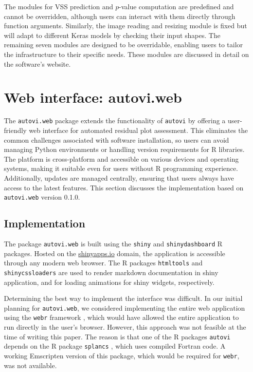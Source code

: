 \documentclass[
doublespace,
  times]{anzsauth}
\begin{document}
The modules for VSS prediction and \(p\)-value computation are
predefined and cannot be overridden, although users can interact with
them directly through function arguments. Similarly, the image reading
and resizing module is fixed but will adapt to different Keras models by
checking their input shapes. The remaining seven modules are designed to
be overridable, enabling users to tailor the infrastructure to their
specific needs. These modules are discussed in detail on the software's
website.

\section{Web interface: autovi.web}\label{sec-autovi-web}

The \texttt{autovi.web} package extends the functionality of
\texttt{autovi} by offering a user-friendly web interface for automated
residual plot assessment. This eliminates the common challenges
associated with software installation, so users can avoid managing
Python environments or handling version requirements for R libraries.
The platform is cross-platform and accessible on various devices and
operating systems, making it suitable even for users without R
programming experience. Additionally, updates are managed centrally,
ensuring that users always have access to the latest features. This
section discusses the implementation based on \texttt{autovi.web}
version 0.1.0.

\subsection{Implementation}\label{implementation}

The package \texttt{autovi.web} is built using the \texttt{shiny}
\citep{shiny} and \texttt{shinydashboard} \citep{shinydashboard} R
packages. Hosted on the \href{https://www.shinyapps.io}{shinyapps.io}
domain, the application is accessible through any modern web browser.
The R packages \texttt{htmltools} \citep{htmltools} and
\texttt{shinycssloaders} \citep{shinycssloaders} are used to render
markdown documentation in shiny application, and for loading animations
for shiny widgets, respectively.

Determining the best way to implement the interface was difficult. In
our initial planning for \texttt{autovi.web}, we considered implementing
the entire web application using the \texttt{webr} framework
\citep{webr}, which would have allowed the entire application to run
directly in the user's browser. However, this approach was not feasible
at the time of writing this paper. The reason is that one of the R
packages \texttt{autovi} depends on the R package \texttt{splancs}
\citep{splancs}, which uses compiled Fortran code. A working Emscripten
\citep{zakai2011emscripten} version of this package, which would be
required for \texttt{webr}, was not available.
\end{document}
